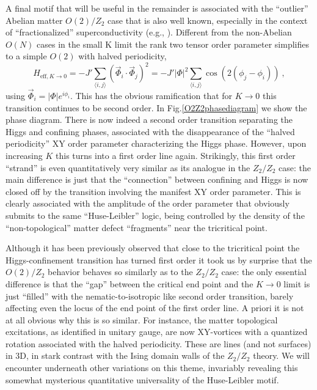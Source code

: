 A final motif that will be useful in the remainder is associated with the ``outlier'' Abelian matter $O(2)/Z_2$ case that is also well known, especially in the context of ``fractionalized'' superconductivity (e.g., \cite{visons}).  Different from the non-Abelian $O(N)$ cases in the small K limit the rank two tensor order parameter simplifies to a simple $O(2)$ with halved periodicity, 
\begin{equation}
	H_{\mathrm{eff}, K \rightarrow 0} = -J' \sum_{\langle i, j \rangle} \left( \vec{\Phi}_i \cdot \vec{\Phi}_j \right)^2  = -J' |\Phi|^2 \sum_{\langle i, j \rangle} \cos \left( 2 (\phi_j - \phi_i ) \right) ~,
	\label{directorH}
\end{equation}         
using $\vec{\Phi}_i = |\Phi | e^{i \phi_i}$. This has the obvious ramification that for $K \rightarrow 0$ this transition continues to be second order.  In Fig.\ref{O2Z2phasediagram} we show the phase diagram. There is now indeed a second order transition separating the Higgs and confining phases, associated with the disappearance of the ``halved periodicity'' XY order parameter characterizing the Higgs phase. However, upon increasing $K$ this turns into a first order line again. Strikingly, this first order ``strand'' is even quantitatively very similar as its analogue in the $Z_2/Z_2$ case: the main difference is just that the ``connection'' between confining and Higgs is now closed off by the transition involving the manifest XY order parameter.  This is clearly associated with the amplitude of the order parameter that obviously submits to the same ``Huse-Leibler'' logic, being controlled by the density of the ``non-topological'' matter defect ``fragments'' near the tricritical point. 

Although it has been previously observed that close to the tricritical point the Higgs-confinement transition has turned first order \cite{Senthil} it took us by surprise that the $O(2)/Z_2$ behavior behaves so similarly as to the $Z_2/Z_2$ case: the only essential difference is that the ``gap'' between the critical end point and the $K \rightarrow 0$ limit is just ``filled'' with the nematic-to-isotropic like second order transition, barely affecting even the locus of the end point of the first order line. A priori it is not at all obvious why this is so similar. For instance, the matter topological excitations, as identified in unitary gauge, are now XY-vortices with a quantized rotation associated with the halved periodicity. These are lines (and not surfaces) in 3D, in stark contrast with the Ising domain walls of the $Z_2/Z_2$ theory. We will encounter underneath other variations on this theme, invariably revealing this somewhat mysterious quantitative universality of the Huse-Leibler motif.     


